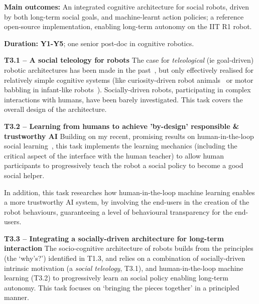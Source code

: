\begin{framed}
    \textbf{Main outcomes:} An integrated cognitive architecture for social
    robots, driven by both long-term social goals, and machine-learnt action
    policies; a reference open-source implementation, enabling long-term
    autonomy on the IIT R1 robot.

    \textbf{Duration:} \textbf{Y1-Y5}; one senior post-doc in
cognitive robotics.

\end{framed}

\textbf{T3.1 -- A social teleology for robots}
The case for \emph{teleological} (ie goal-driven) robotic architectures has been
made in the past~\cite{wrede2012towards}, but only effectively realised for
relatively simple cognitive systems (like curiosity-driven robot
animals~\cite{oudeyer2005playground} or motor babbling in infant-like
robots~\cite{forestier2017unified}). Socially-driven robots, participating in
complex interactions with humans, have been barely investigated. This task
covers the overall design of the architecture.


\textbf{T3.2 -- Learning from humans to achieve 'by-design' responsible \&
trustworthy AI} Building on my recent, promising results on human-in-the-loop
social learning~\cite{senft2017supervised,senft2019teaching,winkle2020couch}, this task
implements the learning mechanics (including the critical aspect of the
interface with the human teacher) to allow human participants to progressively
teach the robot a social policy to become a good social helper.

In addition, this task researches how human-in-the-loop machine learning enables a more
trustworthy AI system, by involving the end-users in the creation of the robot
behaviours, guaranteeing a level of behavioural transparency for the end-users.

\textbf{T3.3 -- Integrating a socially-driven architecture for long-term interaction} The
socio-cognitive architecture of \project robots builds from the principles (the
`why's?') identified in T1.3, and relies on a combination of socially-driven
intrinsic motivation (a \emph{social teleology}, T3.1), and human-in-the-loop machine
learning (T3.2) to progressively learn an social policy enabling long-term
autonomy. This task focuses on `bringing the pieces together' in a principled
manner.

